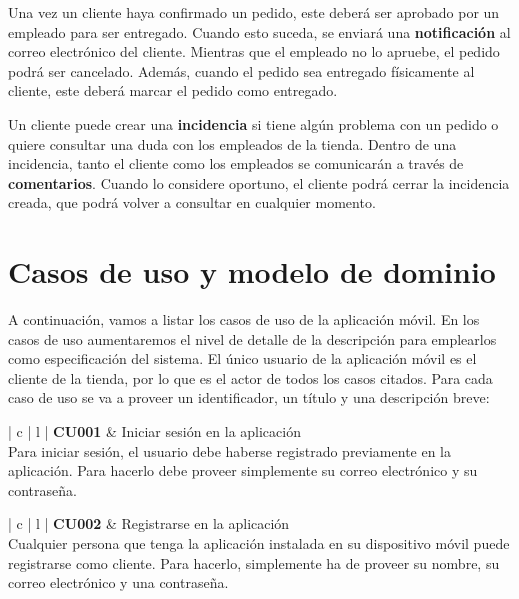 \documentclass[11pt,spanish,listoffigures]{tfgetsinf}
\begin{document}
Una vez un cliente haya confirmado un pedido, este deberá ser aprobado por un empleado para ser entregado. Cuando esto suceda, se enviará una \textbf{notificación} al correo electrónico del cliente. Mientras que el empleado no lo apruebe, el pedido podrá ser cancelado. Además, cuando el pedido sea entregado físicamente al cliente, este deberá marcar el pedido como entregado.

Un cliente puede crear una \textbf{incidencia} si tiene algún problema con un pedido o quiere consultar una duda con los empleados de la tienda. Dentro de una incidencia, tanto el cliente como los empleados se comunicarán a través de \textbf{comentarios}. Cuando lo considere oportuno, el cliente podrá cerrar la incidencia creada, que podrá volver a consultar en cualquier momento.

\section{Casos de uso y modelo de dominio} \label{sect:CUs}

A continuación, vamos a listar los casos de uso de la aplicación móvil. En los casos de uso aumentaremos el nivel de detalle de la descripción para emplearlos como especificación del sistema. El único usuario de la aplicación móvil es el cliente de la tienda, por lo que es el actor de todos los casos citados. Para cada caso de uso se va a proveer un identificador, un título y una descripción breve:

\begin{center}
\begin{tabular}{ | c | l | }
\hline
\textbf{ CU001 } & Iniciar sesión en la aplicación \\
\hline
{}
{
Para iniciar sesión, el usuario debe haberse registrado previamente en la aplicación. Para hacerlo debe proveer simplemente su correo electrónico y su contraseña.
} \\
\hline
\end{tabular}
\end{center}

\begin{center}
\begin{tabular}{ | c | l | }
\hline
\textbf{ CU002 } & Registrarse en la aplicación \\
\hline
{}
{
Cualquier persona que tenga la aplicación instalada en su dispositivo móvil puede registrarse como cliente. Para hacerlo, simplemente ha de proveer su nombre, su correo electrónico y una contraseña.
} \\
\hline
\end{tabular}
\end{center}
\end{document}
